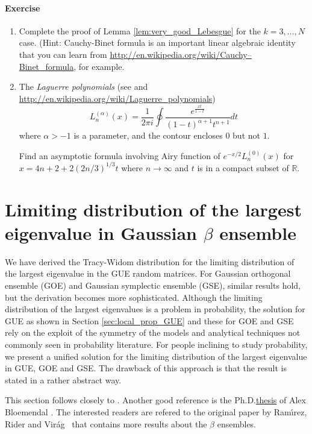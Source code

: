 \documentclass[11pt, a4paper]{article}
\numberwithin{equation}{section}
\newcommand{\realR}{\mathbb{R}}
\newcommand{\Ramirez}{Ram{\'{\i}}rez}
\newcommand{\Virag}{Vir{\'a}g}
\theoremstyle{definition}
\theoremstyle{remark}
\begin{document}
\paragraph{Exercise}

\begin{enumerate}
\item 
  Complete the proof of Lemma \ref{lem:very_good_Lebesgue} for the $k = 3, \dotsc, N$ case. (Hint: Cauchy-Binet formula is an important linear algebraic identity that you can learn from \url{http://en.wikipedia.org/wiki/Cauchy–Binet_formula}, for example.
\item
  The \emph{Laguerre polynomials} (see \cite{Szego75} and \url{http://en.wikipedia.org/wiki/Laguerre_polynomials})
  \begin{equation}
    L^{(\alpha)}_n(x) = \frac{1}{2\pi i} \oint \frac{e^{\frac{xt}{1 - t}}}{(1 - t)^{\alpha + 1} t^{n + 1}} dt
  \end{equation}
  where $\alpha > -1$ is a parameter, and the contour encloses $0$ but not $1$.

  Find an asymptotic formula involving Airy function of $e^{-x/2} L^{(0)}_n(x)$ for $x = 4n + 2 + 2(2n/3)^{1/3} t$ where $n \to \infty$ and $t$ is in a compact subset of $\realR$.
\end{enumerate}

\section{Limiting distribution of the largest eigenvalue in Gaussian $\beta$ ensemble}

We have derived the Tracy-Widom distribution for the limiting distribution of the largest eigenvalue in the GUE random matrices. For Gaussian orthogonal ensemble (GOE) and Gaussian symplectic ensemble (GSE), similar results hold, but the derivation becomes more sophisticated. Although the limiting distribution of the largest eigenvalues is a problem in probability, the solution for GUE as shown in Section \ref{sec:local_prop_GUE} and these for GOE and GSE rely on the exploit of the symmetry of the models and analytical techniques not commonly seen in probability literature. For people inclining to study probability, we present a unified solution for the limiting distribution of the largest eigenvalue in GUE, GOE and GSE. The drawback of this approach is that the result is stated in a rather abstract way.

This section follows closely to \cite[Section 4.5]{Anderson-Guionnet-Zeitouni10}. Another good reference is the Ph.D.\@ \href{https://tspace.library.utoronto.ca/bitstream/1807/31693/3/Bloemendal_Alex_201111_PhD_Thesis.pdf}{thesis} of Alex Bloemendal \cite{Bloemendal11}. The interested readers are refered to the original paper by \Ramirez, Rider and \Virag\ \cite{Ramirez-Rider-Virag11} that contains more results about the $\beta$ ensembles.
\end{document}

